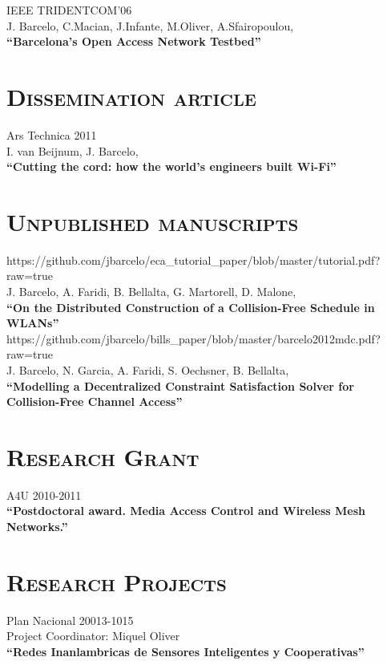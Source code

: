 \documentclass[line,margin]{res}
\begin{document}
\begin{resume}
\hfill {IEEE TRIDENTCOM'06} \\
J. Barcelo, C.Macian, J.Infante, M.Oliver, A.Sfairopoulou,\\
\textbf{``Barcelona's Open Access Network Testbed''}\\

\section{\textsc{Dissemination article}}
\hfill {Ars Technica 2011} \\
I. van Beijnum, J. Barcelo, \\
\textbf{``Cutting the cord: how the world's engineers built Wi-Fi''}\\

\section{\textsc{Unpublished manuscripts}}
\hfill {https://github.com/jbarcelo/eca\_tutorial\_paper/blob/master/tutorial.pdf?raw=true} \\
J. Barcelo, A. Faridi, B. Bellalta, G. Martorell, D. Malone, \\
\textbf{``On the Distributed Construction of a Collision-Free Schedule in WLANs''}\\

\hfill {https://github.com/jbarcelo/bills\_paper/blob/master/barcelo2012mdc.pdf?raw=true} \\
J. Barcelo, N. Garcia, A. Faridi, S. Oechsner, B. Bellalta, \\
\textbf{``Modelling a Decentralized Constraint Satisfaction Solver for Collision-Free Channel Access''}\\

\newpage
\section{\textsc{Research Grant}}

\hfill {A4U 2010-2011} \\
\textbf{``Postdoctoral award. Media Access Control and Wireless Mesh Networks.''}\\

\section{\textsc{Research Projects}}

\hfill {Plan Nacional 20013-1015} \\
Project Coordinator: Miquel Oliver\\
\textbf{``Redes Inanlambricas de Sensores Inteligentes y Cooperativas''}\\


\end{resume}
\end{document}
